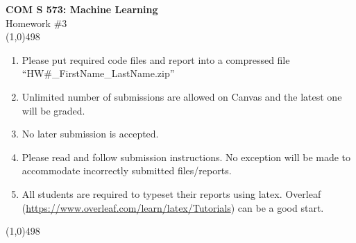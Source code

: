 \documentclass[11pt]{article}
\begin{document}
\begin{center}
{\Large \textbf{COM S 573: Machine Learning}\\Homework \#3}\\

\linethickness{1mm}\line(1,0){498}

\begin{enumerate}
\item Please put required code files and report into a
compressed file ``HW\#\_FirstName\_LastName.zip''
\item Unlimited number of submissions are
allowed on Canvas and the latest one will be graded.
\item {\color{red} No later submission is accepted.}
\item Please read and follow submission instructions. No exception
will be made to accommodate incorrectly submitted files/reports.
\item All students are required to typeset their reports using
latex. Overleaf
(\url{https://www.overleaf.com/learn/latex/Tutorials}) can be a
good start.
\end{enumerate}

\linethickness{1mm}\line(1,0){498}

\end{center}


\end{document}
